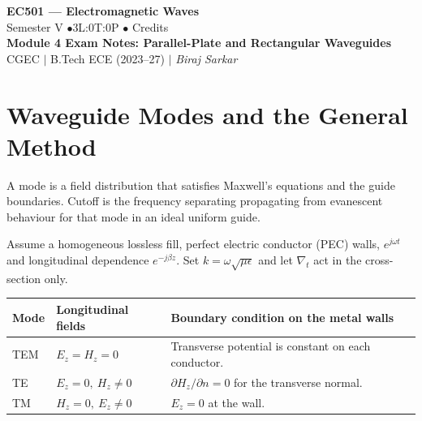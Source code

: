 \documentclass[12pt,a4paper]{article}
\begin{document}

\begin{center}
  {\LARGE\bfseries\color{myred} EC501 --- Electromagnetic Waves}\\[5pt]
  {\normalsize\color{mydark} Semester V \quad$\bullet$\quad 3L:0T:0P \quad$\bullet$ Credits}\\[3pt]
  {\normalsize\color{myteal}\textbf{Module 4 Exam Notes: Parallel-Plate and Rectangular Waveguides}}\\[3pt]
  {\small\color{mydark} CGEC \;$|$\; B.Tech ECE (2023--27) \;$|$\; \textit{Biraj Sarkar}}
\end{center}
\vspace{2pt}
\noindent{\color{myred}\rule{\linewidth}{1.5pt}}
\vspace{2pt}

\hypersetup{linkcolor=mydark}
\tableofcontents
\hypersetup{linkcolor=myteal}
\newpage

\section{Waveguide Modes and the General Method}
\begin{tcolorbox}[defbox,title={Mode and cutoff}]
A mode is a field distribution that satisfies Maxwell's equations and the guide boundaries. Cutoff is the frequency separating propagating from evanescent behaviour for that mode in an ideal uniform guide.
\end{tcolorbox}

Assume a homogeneous lossless fill, perfect electric conductor (PEC) walls, $e^{j\omega t}$ and longitudinal dependence $e^{-j\beta z}$. Set $k=\omega\sqrt{\mu\epsilon}$ and let $\nabla_t$ act in the cross-section only.
\par\vspace{6pt}\noindent
\begin{tabularx}{\linewidth}{|B{2.5cm}|Y|Y|}\hline
Mode & Longitudinal fields & Boundary condition on the metal walls \\ \hline
TEM & $E_z=H_z=0$ & Transverse potential is constant on each conductor. \\ \hline
TE & $E_z=0,\ H_z\ne0$ & $\partial H_z/\partial n=0$ for the transverse normal. \\ \hline
TM & $H_z=0,\ E_z\ne0$ & $E_z=0$ at the wall. \\ \hline
\end{tabularx}
\end{document}
